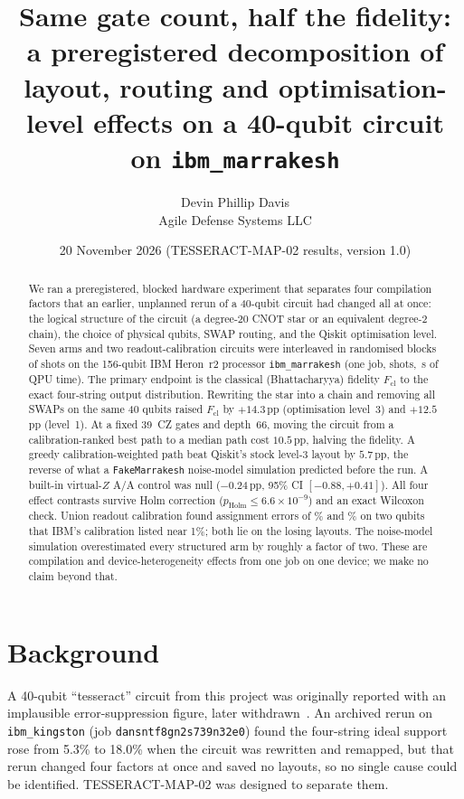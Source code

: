 \documentclass[10pt,twocolumn]{article}
\title{\bfseries Same gate count, half the fidelity: a preregistered decomposition of layout,
routing and optimisation-level effects on a 40-qubit circuit on \texttt{ibm\_marrakesh}}
\author{Devin Phillip Davis\\ \small Agile Defense Systems LLC}
\date{20 November 2026 \quad (TESSERACT-MAP-02 results, version 1.0)}
\begin{document}
\maketitle

\begin{abstract}
\noindent
We ran a preregistered, blocked hardware experiment that separates four compilation factors that an
earlier, unplanned rerun of a 40-qubit circuit had changed all at once: the logical structure of the
circuit (a degree-20 CNOT star or an equivalent degree-2 chain), the choice of physical qubits, SWAP
routing, and the Qiskit optimisation level. Seven arms and two readout-calibration circuits were
interleaved in \Blocks{} randomised blocks of \Shots{} shots on the 156-qubit IBM Heron~r2 processor
\texttt{ibm\_marrakesh} (one job, \TotalShots{} shots, \QpuSeconds{}\,s of QPU time). The primary
endpoint is the classical (Bhattacharyya) fidelity $F_{\mathrm{cl}}$ to the exact four-string output
distribution. Rewriting the star into a chain and removing all SWAPs on the same 40 qubits raised
$F_{\mathrm{cl}}$ by $+14.3$\,pp (optimisation level~3) and $+12.5$\,pp (level~1). At a fixed 39~CZ
gates and depth~66, moving the circuit from a calibration-ranked best path to a median path cost
$10.5$\,pp, halving the fidelity. A greedy calibration-weighted path beat Qiskit's stock level-3
layout by $5.7$\,pp, the reverse of what a \texttt{FakeMarrakesh} noise-model simulation predicted
before the run. A built-in virtual-$Z$ A/A control was null ($-0.24$\,pp, 95\% CI $[-0.88,+0.41]$).
All four effect contrasts survive Holm correction ($p_{\mathrm{Holm}}\le 6.6\times10^{-9}$) and an
exact Wilcoxon check. Union readout calibration found assignment errors of \QFortyTwo\% and
\QFortyOne\% on two qubits that IBM's calibration listed near 1\%; both lie on the losing layouts.
The noise-model simulation overestimated every structured arm by roughly a factor of two. These
are compilation and device-heterogeneity effects from one job on one device; we make no claim beyond
that.
\end{abstract}

\section{Background}
A 40-qubit ``tesseract'' circuit from this project was originally reported with an implausible
error-suppression figure, later withdrawn~\cite{erratum}. An archived rerun on \texttt{ibm\_kingston}
(job \texttt{dansntf8gn2s739n32e0}) found the four-string ideal support rose from 5.3\% to 18.0\% when
the circuit was rewritten and remapped, but that rerun changed four factors at once and saved no
layouts, so no single cause could be identified. TESSERACT-MAP-02 was designed to separate them.
\end{document}
